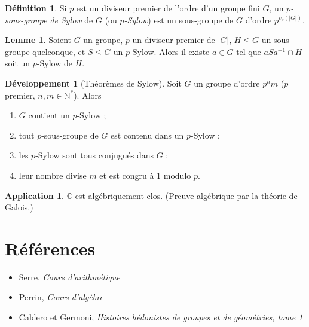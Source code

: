 \documentclass[a5paper, 10pt]{article}
\theoremstyle{definition}
\newtheorem{definition}[equation]{Définition}
\newtheorem{application}[equation]{Application}
\newtheorem{lemma}[equation]{Lemme}
\newcounter{n}
\newtheorem{dev}[n]{Développement}
\def\N{\mathbb{N}}
\def\C{\mathbb{C}}
\begin{document}
\begin{definition}
  Si $p$ est un diviseur premier de l'ordre d'un groupe fini $G$, un
  \emph{$p$-sous-groupe de Sylow} de $G$ (ou \emph{$p$-Sylow}) est un
  sous-groupe de $G$ d'ordre $p^{v_p(|G|)}$.
\end{definition}
\begin{lemma}
  Soient $G$ un groupe, $p$ un diviseur premier de $|G|$, $H \leq G$
  un sous-groupe quelconque, et $S \leq G$ un $p$-Sylow. Alors il
  existe $a \in G$ tel que $aSa^{-1} \cap H$ soit un $p$-Sylow de $H$.
\end{lemma}
\begin{dev}[Théorèmes de Sylow]
  Soit $G$ un groupe d'ordre $p^n m$ ($p$ premier, $n, m \in
  \N^*$). Alors
  \begin{enumerate}
  \item $G$ contient un $p$-Sylow ;
  \item tout $p$-sous-groupe de $G$ est contenu dans un $p$-Sylow ;
  \item les $p$-Sylow sont tous conjugués dans $G$ ;
  \item leur nombre divise $m$ et est congru à 1 modulo $p$.
  \end{enumerate}
\end{dev}

\begin{application}
  $\C$ est algébriquement clos. (Preuve algébrique par la théorie de
  Galois.)
\end{application}

\section{Références}

\begin{itemize}
\item Serre, \emph{Cours d'arithmétique}
\item Perrin, \emph{Cours d'algèbre}
\item Caldero et Germoni, \emph{Histoires hédonistes de groupes et de géométries, tome 1}
\end{itemize}
\end{document}
